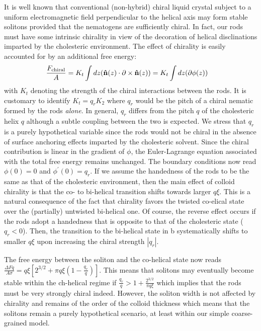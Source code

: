 It is well known that conventional (non-hybrid) chiral liquid crystal subject to a uniform electromagnetic field perpendicular to the helical axis may form stable solitons provided that the nematogens are sufficiently chiral.  In fact, our rods must have some intrinsic chirality in view of the decoration of helical disclinations imparted by the cholesteric environment. The effect of chirality is easily accounted for by an additional free energy:
\begin{align}
\frac{F_{\rm chiral}}{A} &= K_{t} \int d z  ({\bf \hat{n}}(z) \cdot \partial \times {\bf \hat{n}}(z) )=  K_{t} \int d z (\partial \phi(z) )
\end{align}
with $K_{t}$ denoting the strength of the chiral interactions between the rods. It is customary to identify $K_{t} =q_{r} K_{2}$ where $q_{r}$ would be the pitch of a chiral nematic formed by the rods {\em alone}. In general, $q_{r}$ differs from the pitch $q$ of the cholesteric helix $q$ although a subtle coupling between the two is expected. We stress that $q_{r}$  is a purely hypothetical variable since the rods would not be chiral in the absence of surface anchoring effects imparted by the cholesteric solvent.
Since the chiral contribution is linear in the gradient of $\phi$, the Euler-Lagrange equation  associated with the total free energy remains unchanged. The boundary conditions now read $\phi(0) = 0$ and $\phi^{\prime}(0) = q_{r}$. If we assume the handedness of the rods to be the same as that of the cholesteric environment, then the main effect of colloid chirality is that the co- to bi-helical transition shifts towards larger $q \xi$. This is a natural consequence of the fact that chirality favors the twisted co-elical state over the (partially) untwisted bi-helical one. Of course, the reverse effect occurs if the rods adopt a handedness that is opposite to that of the cholesteric state ($q_{r} <0$). Then, the transition to the bi-helical state in b systematically shifts to smaller $q\xi$ upon increasing the chiral strength $|q_{r}|$.


The free energy between the soliton and the  co-helical state now reads $ \tfrac{\Delta Fq}{ A \sigma} = q \xi [ 2^{3/2}+  \pi q \xi (1-\tfrac{q_{r}}{q})]$. This means that solitons may eventually become stable within the ch-helical regime if $\tfrac{q_{r}}{q} > 1 + \tfrac{2^{3/2}}{\pi q \xi}$ which implies that the rods must be very strongly chiral indeed. However, the soliton width is not affected by chirality and remains of the order of the colloid thickness which means that the solitons remain a purely hypothetical scenario, at least within our simple coarse-grained model.

